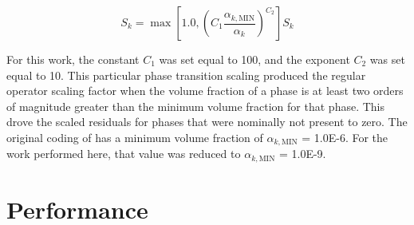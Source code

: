 \begin{equation}
\label{eqn:scaling_factor_small}
S_k = \max[1.0, \left(C_1 \frac{\alpha_{k,\text{MIN}}}{\alpha_k}\right)^{C_2} ] S_k
\end{equation}

For this work, the constant $C_1$ was set equal to 100, and the exponent $C_2$ was set equal to 10.
This particular phase transition scaling produced the regular operator scaling factor when the volume fraction of a phase is at least two orders of magnitude greater than the minimum volume fraction for that phase.
This drove the scaled residuals for phases that were nominally not present to zero.
The original coding of \cobra{} has a minimum volume fraction of $\alpha_{k,\text{MIN}}$ = 1.0E-6.
For the work performed here, that value was reduced to $\alpha_{k,\text{MIN}}$ = 1.0E-9.

\section{Performance}
\label{sect:nln_solver:performance}